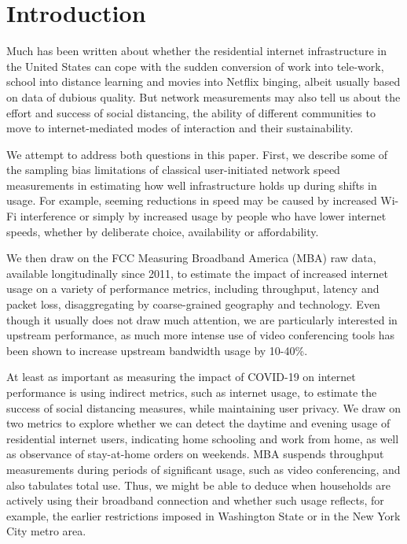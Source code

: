 \documentclass[conference,10pt]{IEEEtran}
\begin{document}
\section{Introduction}
\label{sec:introduction}

Much has been written about whether the residential internet infrastructure in the United States can cope with the sudden conversion of work into tele-work, school into distance learning and movies into Netflix binging, albeit usually based on data of dubious quality. But network measurements may also tell us about the effort and success of social distancing, the ability of different communities to move to internet-mediated modes of interaction and their sustainability.

We attempt to address both questions in this paper. First, we describe some of the sampling bias limitations of classical user-initiated network speed measurements in estimating how well infrastructure holds up during shifts in usage. For example, seeming reductions in speed may be caused by increased Wi-Fi interference or simply by increased usage by people who have lower internet speeds, whether by deliberate choice, availability or affordability.

We then draw on the FCC Measuring Broadband America (MBA) raw data, available longitudinally since 2011, to estimate the impact of increased internet usage on a variety of performance metrics, including throughput, latency and packet loss, disaggregating by coarse-grained geography and technology. Even though it usually does not draw much attention, we are particularly interested in upstream performance, as much more intense use of video conferencing tools has been shown to increase upstream bandwidth usage by 10-40\%.

At least as important as measuring the impact of COVID-19 on internet performance is using indirect metrics, such as internet usage, to estimate the success of social distancing measures, while maintaining user privacy. We draw on two metrics to explore whether we can detect the daytime and evening usage of residential internet users, indicating home schooling and work from home, as well as observance of stay-at-home orders on weekends. MBA suspends throughput measurements during periods of significant usage, such as video conferencing, and also tabulates total use. Thus, we might be able to deduce when households are actively using their broadband connection and whether such usage reflects, for example, the earlier restrictions imposed in Washington State or in the New York City metro area.
\end{document}

